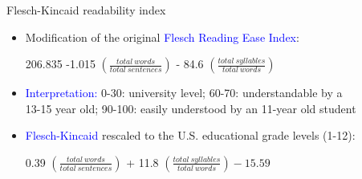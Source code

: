 \documentclass[english]{beamer}
\begin{document}
\begin{frame}{Flesch-Kincaid readability index}
\begin{itemize}
\setlength{\itemsep}{1.3em}
\setlength{\itemindent}{-0.5em}
\item Modification of the original \textcolor{blue}{Flesch Reading Ease Index}:\\
\vspace{5pt}
\begin{center}
206.835 -1.015 $(\frac{total\:words}{total\:sentences})$ - 84.6 $(\frac{total\:syllables}{total\:words})$
\end{center}
\vspace{5pt}
\item \textcolor{blue}{Interpretation:} 0-30: university level; 60-70: understandable by a\\
\hspace{-5pt}13-15 year old; 90-100: easily understood by an 11-year old student

\item \textcolor{blue}{Flesch-Kincaid} rescaled to the U.S. educational grade levels (1-12):\\
\vspace{5pt}
\begin{center}
0.39 $(\frac{total\:words}{total\:sentences})$ + 11.8 $(\frac{total\:syllables}{total\:words}) -15.59$
\end{center}
\vspace{5pt}
\end {itemize}
\end{frame}
\end{document}
